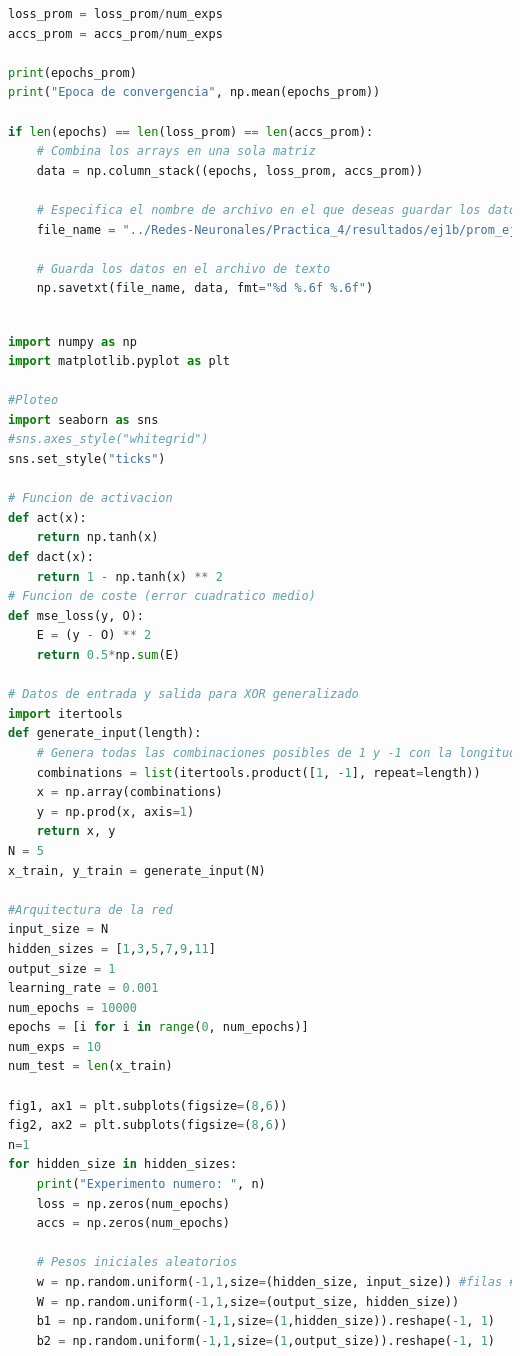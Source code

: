 \documentclass[11pt,twocolumn,twoside]{opticajnl}
\begin{document}
\begin{onecolumn}
\begin{lstlisting}[language=Python, caption={Ejercicio 1 - Arquitectura 2-1-1}, label=ej1b]
loss_prom = loss_prom/num_exps
accs_prom = accs_prom/num_exps

print(epochs_prom)
print("Epoca de convergencia", np.mean(epochs_prom))

if len(epochs) == len(loss_prom) == len(accs_prom):
    # Combina los arrays en una sola matriz
    data = np.column_stack((epochs, loss_prom, accs_prom))

    # Especifica el nombre de archivo en el que deseas guardar los datos
    file_name = "../Redes-Neuronales/Practica_4/resultados/ej1b/prom_ej1b.txt"

    # Guarda los datos en el archivo de texto
    np.savetxt(file_name, data, fmt="%d %.6f %.6f")


\end{lstlisting}

\begin{lstlisting}[language=Python, caption={Ejercicio 2}, label=ej2]

import numpy as np
import matplotlib.pyplot as plt

#Ploteo 
import seaborn as sns
#sns.axes_style("whitegrid")
sns.set_style("ticks")

# Funcion de activacion
def act(x):
    return np.tanh(x)
def dact(x):
    return 1 - np.tanh(x) ** 2
# Funcion de coste (error cuadratico medio)
def mse_loss(y, O):
    E = (y - O) ** 2
    return 0.5*np.sum(E)

# Datos de entrada y salida para XOR generalizado 
import itertools
def generate_input(length):
    # Genera todas las combinaciones posibles de 1 y -1 con la longitud deseada
    combinations = list(itertools.product([1, -1], repeat=length))
    x = np.array(combinations)
    y = np.prod(x, axis=1)
    return x, y
N = 5
x_train, y_train = generate_input(N)

#Arquitectura de la red
input_size = N
hidden_sizes = [1,3,5,7,9,11]
output_size = 1
learning_rate = 0.001
num_epochs = 10000
epochs = [i for i in range(0, num_epochs)]
num_exps = 10
num_test = len(x_train)

fig1, ax1 = plt.subplots(figsize=(8,6)) 
fig2, ax2 = plt.subplots(figsize=(8,6)) 
n=1
for hidden_size in hidden_sizes:
    print("Experimento numero: ", n)
    loss = np.zeros(num_epochs)
    accs = np.zeros(num_epochs)

    # Pesos iniciales aleatorios
    w = np.random.uniform(-1,1,size=(hidden_size, input_size)) #filas #columnas
    W = np.random.uniform(-1,1,size=(output_size, hidden_size)) 
    b1 = np.random.uniform(-1,1,size=(1,hidden_size)).reshape(-1, 1) 
    b2 = np.random.uniform(-1,1,size=(1,output_size)).reshape(-1, 1)


\end{lstlisting}
\end{onecolumn}
\end{document}
